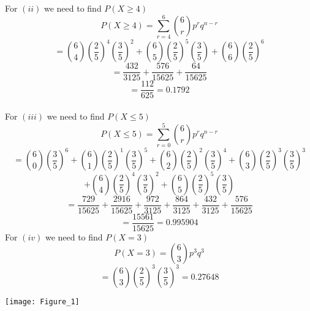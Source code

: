 \documentclass[journal,12pt,twocolumn]{IEEEtran}
\begin{document}
For \((ii)\) we need to find \(P(X \geq 4)\)
\[P(X \geq 4)  = \sum_{r = 4}^6 {6 \choose r} p^r q^{n-r}\]
\[= {6 \choose 4} \left(\frac{2}{5} \right)^4 \left(\frac{3}{5} \right)^2 + {6 \choose 5} \left(\frac{2}{5} \right)^5 \left(\frac{3}{5} \right) + {6 \choose 6} \left(\frac{2}{5} \right)^6  \]
\[=\frac{432}{3125} + \frac{576}{15625} + \frac{64}{15625}\]
\[= \frac{112}{625} = 0.1792\]
\\
For \((iii)\) we need to find \(P(X \leq 5)\)
\[P(X \leq 5) = \sum_{r = 0}^5 {6 \choose r} p^r q^{n - r}\]
\[= {6 \choose 0} \left(\frac{3}{5} \right)^6 + {6 \choose 1} \left(\frac{2}{5} \right)^1 \left(\frac{3}{5} \right)^5 + {6 \choose 2} \left(\frac{2}{5} \right)^2 \left(\frac{3}{5} \right)^4 +{6 \choose 3} \left(\frac{2}{5} \right)^3 \left(\frac{3}{5} \right)^3\]\[ + {6 \choose 4} \left(\frac{2}{5} \right)^4 \left(\frac{3}{5} \right)^2 + {6 \choose 5} \left(\frac{2}{5} \right)^5 \left(\frac{3}{5} \right)\]
\[= \frac{729}{15625} + \frac{2916}{15625} + \frac{972}{3125} + \frac{864}{3125} + \frac{432}{3125} + \frac{576}{15625}\]
\[= \frac{15561}{15625} = 0.995904\]
For \((iv)\) we need to find \(P(X = 3)\)
\[P(X = 3) = {6 \choose 3} p^3 q^3\]
\[={6 \choose 3} \left(\frac{2}{5} \right)^3 \left(\frac{3}{5} \right)^3 = 0.27648\]

\texttt{[image: Figure\_1]}
\end{document}
